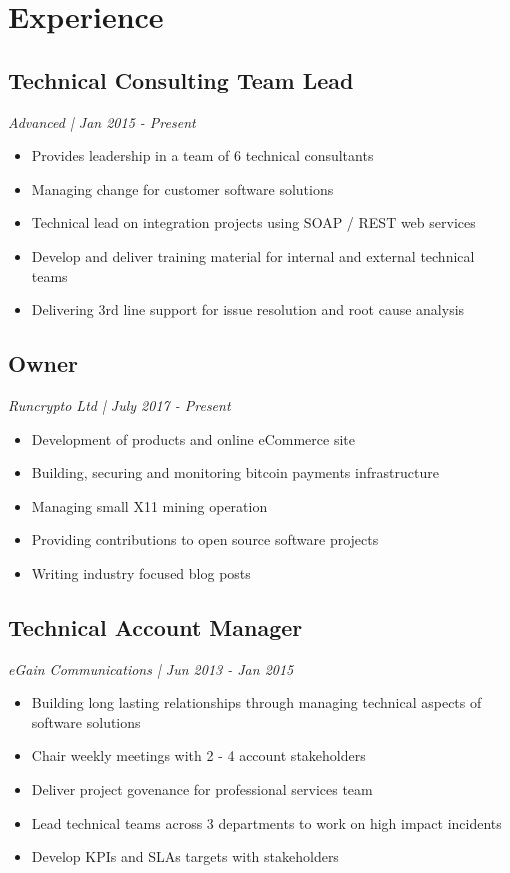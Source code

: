 %
%
\section{Experience}
%
%
\subsection{Technical Consulting Team Lead}
\textit{ Advanced | Jan 2015 - Present }
\begin{itemize}
\vspace{6pt}
	\item Provides leadership in a team of 6 technical consultants
	\item Managing change for customer software solutions
	\item Technical lead on integration projects using SOAP / REST web services
	\item Develop and deliver training material for internal and external technical teams
	\item Delivering 3rd line support for issue resolution and root cause analysis
\end{itemize}

%
%
\subsection{Owner}
\textit{ Runcrypto Ltd | July 2017 - Present }
\begin{itemize}
	\item Development of products and online eCommerce site
	\item Building, securing and monitoring bitcoin payments infrastructure
	\item Managing small X11 mining operation
	\item Providing contributions to open source software projects
	\item Writing industry focused blog posts
\end{itemize}

%
%
\subsection{Technical Account Manager}
\textit{ eGain Communications | Jun 2013 - Jan 2015 }
\begin{itemize}
	\item Building long lasting relationships through managing technical aspects of software solutions
	\item Chair weekly meetings with 2 - 4 account stakeholders
	\item Deliver project govenance for professional services team
	\item Lead technical teams across 3 departments to work on high impact incidents
	\item Develop KPIs and SLAs targets with stakeholders
\end{itemize}

